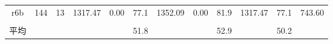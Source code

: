 \begin{landscape}
\begin{table}[]
\begin{tabular}{cccrrrrrrrrr}
  r6b                  & 144                  & 13                   & \multicolumn{1}{l}{1317.47} & 0.00                       & 77.1                        & 1352.09                 & 0.00                       & 81.9                        & 1317.47                 & 77.1                        & 743.60                               \\
  \multicolumn{1}{l}{} & \multicolumn{1}{l}{} & \multicolumn{1}{l}{} & \multicolumn{1}{l}{}        & \multicolumn{1}{l}{}       & \multicolumn{1}{l}{}        & \multicolumn{1}{l}{}    & \multicolumn{1}{l}{}       & \multicolumn{1}{l}{}        & \multicolumn{1}{l}{}    & \multicolumn{1}{l}{}        & \multicolumn{1}{l}{}                 \\
  平均                   & \multicolumn{1}{l}{} & \multicolumn{1}{l}{} & \multicolumn{1}{l}{}        & \multicolumn{1}{l}{}       & 51.8                        &                         &                            & 52.9                        &                         & 50.2                        &                                      \\ \hline
  \end{tabular}
  \end{table}
\end{landscape}


